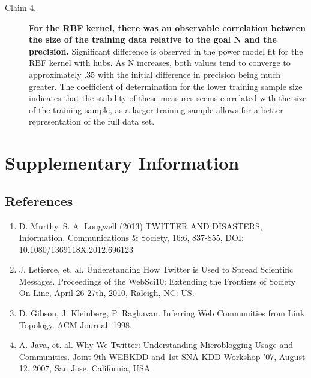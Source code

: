\documentclass{sig-alternate-10pt}
\begin{document}
\begin{description}
    \item [Claim 4.]
    \textbf{For the RBF kernel, there was an observable correlation between the size of the training data relative to the goal N and the precision.}
    Significant difference is observed in the power model fit for the RBF kernel with hubs.
    As N increases, both values tend to converge to approximately $.35$ with the initial difference in precision being much greater.
    The coefficient of determination for the lower training sample size indicates that the stability of these measures seems correlated with the size of the training sample, as a larger training sample allows for a better representation of the full data set.
\end{description}



\clearpage
\section{Supplementary Information}
\subsection{References}
\begin{enumerate}
\item D. Murthy, S. A. Longwell (2013) TWITTER AND DISASTERS, Information, Communications \& Society, 16:6, 837-855, DOI: 10.1080/1369118X.2012.696123

\item J. Letierce, et. al. Understanding How Twitter is Used to Spread Scientific Messages. Proceedings of the WebSci10: Extending the Frontiers of Society On-Line, April 26-27th, 2010, Raleigh, NC: US.

\item D. Gibson, J. Kleinberg, P. Raghavan.  Inferring Web Communities from Link Topology.  ACM Journal. 1998.

\item A. Java, et. al. Why We Twitter: Understanding Microblogging Usage and Communities. Joint 9th WEBKDD and 1st SNA-KDD Workshop ’07, August 12, 2007,
San Jose, California, USA
\end{enumerate}
\end{document}
